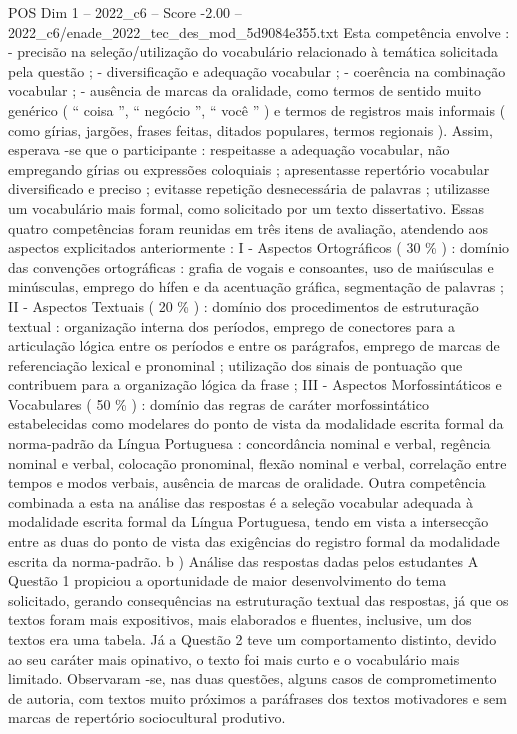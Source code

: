 \begin{textsample}{POS Dim 1 – 2022\_c6 – Score -2.00 – 2022\_c6/enade\_2022\_tec\_des\_mod\_5d9084e355.txt}
Esta competência envolve : - precisão na seleção/utilização do vocabulário relacionado à temática solicitada pela questão ; - diversificação e adequação vocabular ; - coerência na combinação vocabular ; - ausência de marcas da oralidade, como termos de sentido muito genérico ( “ coisa ”, “ negócio ”, “ você ” ) e termos de registros mais informais ( como gírias, jargões, frases feitas, ditados populares, termos regionais ).
Assim, esperava -se que o participante : respeitasse a adequação vocabular, não empregando gírias ou expressões coloquiais ; apresentasse repertório vocabular diversificado e preciso ; evitasse repetição desnecessária de palavras ; utilizasse um vocabulário mais formal, como solicitado por um texto dissertativo.
Essas quatro competências foram reunidas em três itens de avaliação, atendendo aos aspectos explicitados anteriormente : I - Aspectos Ortográficos ( 30 \% ) : domínio das convenções ortográficas : grafia de vogais e consoantes, uso de maiúsculas e minúsculas, emprego do hífen e da acentuação gráfica, segmentação de palavras ; II - Aspectos Textuais ( 20 \% ) : domínio dos procedimentos de estruturação textual : organização interna dos períodos, emprego de conectores para a articulação lógica entre os períodos e entre os parágrafos, emprego de marcas de referenciação lexical e pronominal ; utilização dos sinais de pontuação que contribuem para a organização lógica da frase ; III - Aspectos Morfossintáticos e Vocabulares ( 50 \% ) : domínio das regras de caráter morfossintático estabelecidas como modelares do ponto de vista da modalidade escrita formal da norma-padrão da Língua Portuguesa : concordância nominal e verbal, regência nominal e verbal, colocação pronominal, flexão nominal e verbal, correlação entre tempos e modos verbais, ausência de marcas de oralidade.
Outra competência combinada a esta na análise das respostas é a seleção vocabular adequada à modalidade escrita formal da Língua Portuguesa, tendo em vista a intersecção entre as duas do ponto de vista das exigências do registro formal da modalidade escrita da norma-padrão. b ) Análise das respostas dadas pelos estudantes A Questão 1 propiciou a oportunidade de maior desenvolvimento do tema solicitado, gerando consequências na estruturação textual das respostas, já que os textos foram mais expositivos, mais elaborados e fluentes, inclusive, um dos textos era uma tabela.
Já a Questão 2 teve um comportamento distinto, devido ao seu caráter mais opinativo, o texto foi mais curto e o vocabulário mais limitado.
Observaram -se, nas duas questões, alguns casos de comprometimento de autoria, com textos muito próximos a paráfrases dos textos motivadores e sem marcas de repertório sociocultural produtivo.

\end{textsample}
